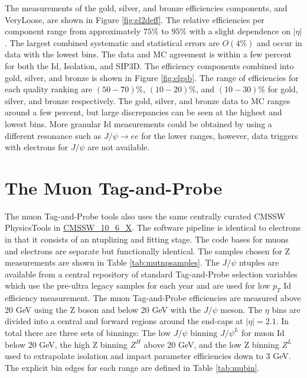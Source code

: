 The measurements of the gold, silver, and bronze efficiencies components, and VeryLoose, are shown in Figure \ref{fig:el2deff}. The relative efficiencies per component range from approximately $75\%$ to $95\%$ with a slight dependence on $|\eta|$. The largest combined systematic and statistical errors are $O(4\%)$ and occur in data with the lowest \pt bins. The data and MC agreement is within a few percent for both the Id, Isolation, and SIP3D. The efficiency components combined into gold, silver, and bronze is shown in Figure \ref{fig:elgsb}. The range of efficiencies for each quality ranking are $(50-70)\%$, $(10-20)\%$, and $(10-30)\%$ for gold, silver, and bronze respectively. The gold, silver, and bronze data to MC ranges around a few percent, but large discrepancies can be seen at the highest and lowest \pt bins. More granular Id measurements could be obtained by using a different resonance such as $J/\psi \rightarrow ee$ for the lower \pt ranges, however, data triggers with electrons for $J/\psi$ are not available.




\FloatBarrier
\section{The Muon Tag-and-Probe}
The muon Tag-and-Probe tools also uses the same centrally curated CMSSW PhysicsTools in \url{CMSSW_10_6_X}. The software pipeline is identical to electrons in that it consists of an ntuplizing \cite{MuTnPTwiki} and fitting \cite{MuTnPAnaTwiki} stage. The code bases for muons and electrons are separate but functionally identical. The samples chosen for Z measurements are shown in Table \ref{tab:mutnpsamples}. The $J/\psi$ ntuples are available from a central repository of standard Tag-and-Probe selection variables which use the pre-ultra legacy samples for each year \cite{MuTnPCentralSamps} and are used for low $p_T$ Id efficiency measurement. The muon Tag-and-Probe efficiencies are measured above 20 GeV using the Z boson and below 20 GeV with the $J/\psi$ meson. The $\eta$ bins are divided into a central and forward regions around the end-caps at $|\eta| = 2.1$. In total there are three sets of binnings: The low \pt $J/\psi$ binning $J/\psi^{L}$ for muon Id below 20 GeV, the high \pt Z binning $Z^{H}$ above 20 GeV, and the low \pt Z binning $Z^{L}$ used to extrapolate isolation and impact parameter efficiencies down to 3 GeV.  The explicit bin edges for each range are defined in Table \ref{tab:mubin}.


